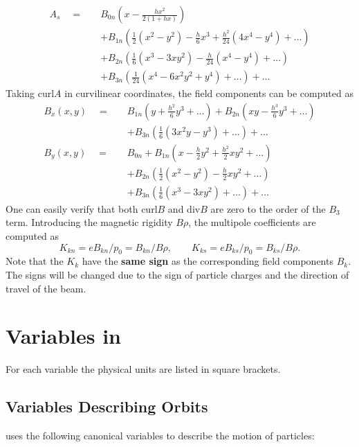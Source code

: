 \begin{align*} 
  A_s \quad = \quad 
  & B_{0n}\left(x-\frac{hx^2}{2(1+hx)}\right) \\
  &+B_{1n}\left(\frac{1}{2}(x^2-y^2)-\frac{h}{6}x^{3}
  +\frac{h^2}{24}(4x^{4}-y^{4})+\ldots\right) \\
  &+B_{2n}\left(\frac{1}{6}(x^{3}-3xy^2)-\frac{h}{24}(x^{4}-y^{4})
   +\ldots\right) \\
  &+B_{3n}\left(\frac{1}{24}(x^{4}-6x^2y^2+y^{4})+\ldots\right)
   + \ldots
\end{align*}
Taking $\mathrm{curl} A$ in curvilinear coordinates,
the field components can be computed as
\begin{align*} 
  B_x(x,y) \quad = \quad
  & B_{1n}\left(y+\frac{h^2}{6}y^{3}+\ldots\right) 
   +B_{2n}\left(xy-\frac{h^{3}}{6}y^{3}+\ldots\right) \\
  &+B_{3n}\left(\frac{1}{6}(3x^2y-y^{3})+\ldots\right) + \ldots \\
  B_y(x,y) \quad = \quad 
  & B_{0n}
   +B_{1n}\left(x-\frac{h}{2}y^2+\frac{h^2}{2}xy^2+\ldots\right) \\
  &+B_{2n}\left(\frac{1}{2}(x^2-y^2)-\frac{h}{2}xy^2+\ldots\right) \\
  &+B_{3n}\left(\frac{1}{6}(x^{3}-3xy^2)+\ldots\right) + \ldots
\end{align*}
One can easily verify that both $\mathrm{curl} B$ and $\mathrm{div} B$
are zero to the order of the $B_3$ term.
Introducing the magnetic rigidity $B \rho$,
the multipole coefficients are computed as
\[
K_{kn}=eB_{kn}/p_0=B_{kn}/B\rho,\qquad
K_{ks}=eB_{ks}/p_0=B_{ks}/B\rho.
\]
Note that the $K_k$ have the \textbf{same sign} as the corresponding
field components $B_k$.
The signs will be changed due to the sign of particle charges and
the direction of travel of the beam.

\section{Variables in \opalt}
\label{sec:variablesopalt}
For each variable the physical units are listed in square brackets.

\subsection{Variables Describing Orbits}
\label{sec:canon}
\opalt uses the following canonical variables
to describe the motion of particles:

